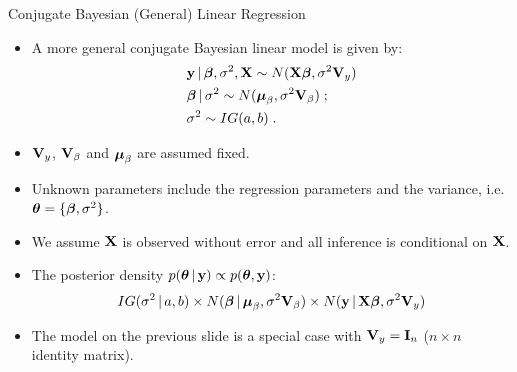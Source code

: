 \begin{frame}{Conjugate Bayesian (General) Linear Regression}
 
\begin{itemize}\setlength{\itemsep}{0.1cm}
 \item \vskip-2mm A more general conjugate Bayesian linear model is given by:
\begin{align*}
& \textbf{y} \,|\, \mbox{\boldmath $ \beta $},\sigma^2, \textbf{X} \sim N(\textbf{X}\mbox{\boldmath $ \beta $}, \sigma^2 \textbf{V}_y)\\
& \mbox{\boldmath $ \beta $} \,|\, \sigma^2 \sim N(\mbox{\boldmath $\mu$}_{\beta}, \sigma^2 \textbf{V}_{\beta})\;;\\
& \sigma^2 \sim IG(a,b)\; .
\end{align*}

\item $\textbf{V}_y$, $\textbf{V}_{\beta}$ and $\mbox{\boldmath $\mu$}_{\beta}$ are assumed fixed.

\item Unknown parameters include the regression parameters and the variance, i.e. $\mbox{\boldmath $ \theta $} = \{\mbox{\boldmath $ \beta $}, \sigma^2\}$. 

\item We assume $\textbf{X}$ is observed without error and all inference is conditional on $\textbf{X}$.

\item The posterior density $p(\mbox{\boldmath $ \theta $} \,|\, \textbf{y}) \propto p(\mbox{\boldmath $ \theta $}, \textbf{y})$:
\begin{align*}
 IG(\sigma^2\,|\, a,b) \times N(\mbox{\boldmath $ \beta $} \,|\, \mbox{\boldmath $\mu$}_{\beta}, \sigma^2 \textbf{V}_{\beta}) \times N(\textbf{y} \,|\, \textbf{X}\mbox{\boldmath $ \beta $}, \sigma^2 \textbf{V}_{y})
\end{align*}

\item The model on the previous slide is a special case with $\textbf{V}_y = \textbf{I}_n$ ($n\times n$ identity matrix).
\end{itemize}

\end{frame}

